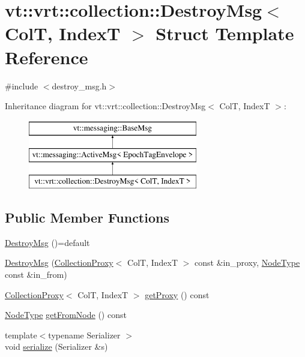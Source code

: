 \hypertarget{structvt_1_1vrt_1_1collection_1_1_destroy_msg}{}\section{vt\+:\+:vrt\+:\+:collection\+:\+:Destroy\+Msg$<$ ColT, IndexT $>$ Struct Template Reference}
\label{structvt_1_1vrt_1_1collection_1_1_destroy_msg}


{\ttfamily \#include $<$destroy\+\_\+msg.\+h$>$}

Inheritance diagram for vt\+:\+:vrt\+:\+:collection\+:\+:Destroy\+Msg$<$ ColT, IndexT $>$\+:\begin{figure}[H]
\begin{center}
\leavevmode
\includegraphics[height=3.000000cm]{structvt_1_1vrt_1_1collection_1_1_destroy_msg}
\end{center}
\end{figure}
\subsection*{Public Member Functions}
\begin{DoxyCompactItemize}
\item 
\hyperlink{structvt_1_1vrt_1_1collection_1_1_destroy_msg_a3c7d44bb51d25e0853cb56c4403c2666}{Destroy\+Msg} ()=default
\item 
\hyperlink{structvt_1_1vrt_1_1collection_1_1_destroy_msg_ab221a719235dd41c48a70e7635721f76}{Destroy\+Msg} (\hyperlink{structvt_1_1vrt_1_1collection_1_1_collection_proxy}{Collection\+Proxy}$<$ ColT, IndexT $>$ const \&in\+\_\+proxy, \hyperlink{namespacevt_a866da9d0efc19c0a1ce79e9e492f47e2}{Node\+Type} const \&in\+\_\+from)
\item 
\hyperlink{structvt_1_1vrt_1_1collection_1_1_collection_proxy}{Collection\+Proxy}$<$ ColT, IndexT $>$ \hyperlink{structvt_1_1vrt_1_1collection_1_1_destroy_msg_a74511cc7aadebf60d6f0927fa88370ec}{get\+Proxy} () const
\item 
\hyperlink{namespacevt_a866da9d0efc19c0a1ce79e9e492f47e2}{Node\+Type} \hyperlink{structvt_1_1vrt_1_1collection_1_1_destroy_msg_a598fc97dc1277e545b741e1272da588c}{get\+From\+Node} () const
\item 
{\footnotesize template$<$typename Serializer $>$ }\\void \hyperlink{structvt_1_1vrt_1_1collection_1_1_destroy_msg_a112e71fb4a34cf0229b78ad36aa4d4ef}{serialize} (Serializer \&s)
\end{DoxyCompactItemize}
